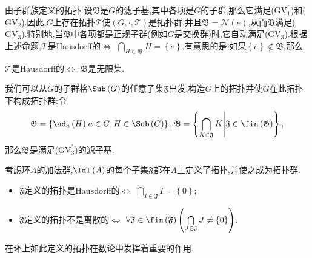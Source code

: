 \begin{example}{由子群族定义的拓扑}{}
	设$\mathfrak{B}$是$G$的滤子基,其中各项是$G$的子群,那么它满足($\mathrm{GV}_{1}^{\prime}$)和($\mathrm{GV}_{2}^{\prime}$).因此,$G$上存在拓扑$\mathscr{T}$使$\left(G,\cdot,\mathscr{T}\right)$是拓扑群,并且$\mathfrak{B}=\mathcal{N}\left(e\right)$,从而$\mathfrak{B}$满足($\mathrm{GV}_{3}$).特别地,当$\mathfrak{B}$中各项都是正规子群(例如$G$是交换群)时,它自动满足($\mathrm{GV}_{3}$).根据上述命题,$\mathscr{T}$是Hausdorff的$\iff$ $\bigcap\limits_{H\in\mathfrak{B}}H=\left\{e\right\}$.有意思的是,如果$\left\{e\right\}\notin\mathfrak{B}$,那么
	\begin{center}
		$\mathscr{T}$是Hausdorff的$\iff$ $\mathfrak{B}$是无限集.
	\end{center}
	我们可以从$G$的子群格$\Sub\left(G\right)$的任意子集$\mathfrak{F}$出发,构造$G$上的拓扑并使$G$在此拓扑下构成拓扑群:令
	\begin{align*}
		\mathfrak{G}=\left\{\ad_{a}\left(H\right)\middle|a\in G,H\in\Sub\left(G\right)\right\},\mathfrak{B}=\left\{\bigcap\limits_{K\in\mathfrak{J}}K\middle|\mathfrak{J}\in\fin\left(\mathfrak{G}\right)\right\},
	\end{align*}
	那么$\mathfrak{B}$是满足($\mathrm{GV}_{3}^{\prime}$)的滤子基.
	
	考虑环$A$的加法群,$\Idl\left(A\right)$的每个子集$\mathfrak{F}$都在$A$上定义了拓扑,并使之成为拓扑群.
	\begin{itemize}
		\item $\mathfrak{F}$定义的拓扑是Hausdorff的$\iff$ $\bigcap\limits_{I\in\mathfrak{F}}I=\left\{0\right\}$;
		\item $\mathfrak{F}$定义的拓扑不是离散的$\iff$ $\forall\mathfrak{J}\in\fin\left(\mathfrak{F}\right)\left(\bigcap\limits_{J\in\mathfrak{J}}J\neq\left\{0\right\}\right)$.
	\end{itemize}
	在环上如此定义的拓扑在数论中发挥着重要的作用.
\end{example}
















































